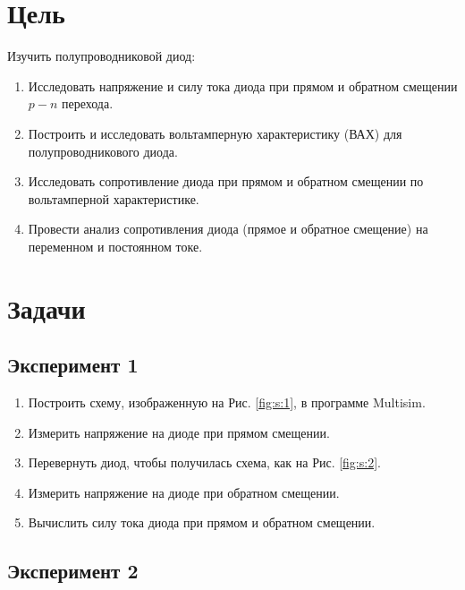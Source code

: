 \documentclass[12pt]{article}
\begin{document}
    \newpage

    \pagestyle{plain}
    \setcounter{page}{1}

    \section*{Цель}

    Изучить полупроводниковой диод:

    \begin{enumerate}
        \item Исследовать напряжение и силу тока диода при прямом и обратном смещении $p-n$ перехода.
        \item Построить и исследовать вольтамперную характеристику (ВАХ) для полупроводникового диода.
        \item Исследовать сопротивление диода при прямом и обратном смещении по вольтамперной характеристике.
        \item Провести анализ сопротивления диода (прямое и обратное смещение) на переменном и постоянном токе.
    \end{enumerate}

    \section*{Задачи}

    \subsection*{Эксперимент 1}

    \begin{enumerate}
        \item Построить схему, изображенную на Рис. \ref{fig:s:1}, в программе Multisim.
        \item Измерить напряжение на диоде при прямом смещении.
        \item Перевернуть диод, чтобы получилась схема, как на Рис. \ref{fig:s:2}.
        \item Измерить напряжение на диоде при обратном смещении.
        \item Вычислить силу тока диода при прямом и обратном смещении.
    \end{enumerate}

    \subsection*{Эксперимент 2}
\end{document}
